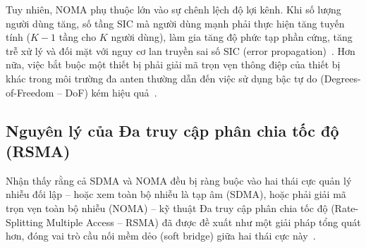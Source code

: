 
Tuy nhiên, NOMA phụ thuộc lớn vào sự chênh lệch độ lợi kênh. Khi số lượng người dùng tăng, số tầng SIC
mà người dùng mạnh phải thực hiện tăng tuyến tính ($K - 1$ tầng cho $K$ người dùng), làm gia tăng độ phức
tạp phần cứng, tăng trễ xử lý và đối mặt với nguy cơ lan truyền sai số SIC (error
propagation)~\cite{Islam2017PowerDomainNOMA}. Hơn nữa, việc bắt buộc một thiết bị phải giải mã trọn vẹn
thông điệp của thiết bị khác trong môi trường đa anten thường dẫn đến việc sử dụng bậc tự do
(Degrees-of-Freedom -- DoF) kém hiệu quả~\cite{Clerckx2021NOMACritical}.

\subsection{Nguyên lý của Đa truy cập phân chia tốc độ (RSMA)}
\label{ssec:rsma}


Nhận thấy rằng cả SDMA và NOMA đều bị ràng buộc vào hai thái cực quản lý nhiễu đối lập -- hoặc xem toàn
bộ nhiễu là tạp âm (SDMA), hoặc phải giải mã trọn vẹn toàn bộ nhiễu (NOMA) -- kỹ thuật Đa truy cập phân
chia tốc độ (Rate-Splitting Multiple Access -- RSMA) đã được đề xuất như một giải pháp tổng quát hơn, đóng
vai trò cầu nối mềm dẻo (soft bridge) giữa hai thái cực này~\cite{Mao2018RSMABridging}.

